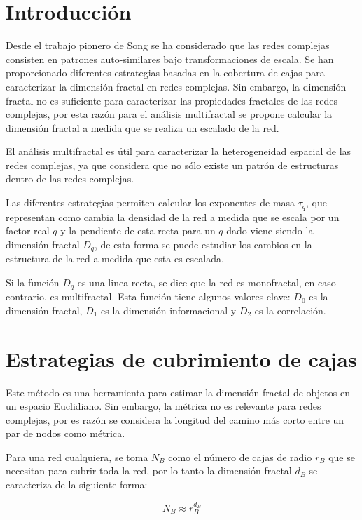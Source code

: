 \section{Introducción}

Desde el trabajo pionero de Song\cite{Song2005} se ha considerado que las redes complejas consisten en patrones auto-similares bajo transformaciones de escala. Se han proporcionado diferentes estrategias basadas en la cobertura de cajas para caracterizar la dimensión fractal en redes complejas. Sin embargo, la dimensión fractal no es suficiente para caracterizar las propiedades fractales de las redes complejas, por esta razón para el análisis multifractal se propone calcular la dimensión fractal a medida que se realiza un escalado de la red.

El análisis multifractal es útil para caracterizar la heterogeneidad espacial de las redes complejas, ya que considera que no sólo existe un patrón de estructuras dentro de las redes complejas.

Las diferentes estrategias permiten calcular los exponentes de masa $\tau_q$, que representan como cambia la densidad de la red a medida que se escala por un factor real $q$ y la pendiente de esta recta para un $q$ dado viene siendo la dimensión fractal $D_q$, de esta forma se puede estudiar los cambios en la estructura de la red a medida que esta es escalada.

Si la función $D_q$ es una linea recta, se dice que la red es monofractal, en caso contrario, es multifractal. Esta función tiene algunos valores clave\cite{Halsey1986}: $D_0$ es la dimensión fractal, $D_1$ es la dimensión  informacional y $D_2$ es la correlación.

\section{Estrategias de cubrimiento de cajas}
\label{cap4:seccionBox}

Este método es una herramienta para estimar la dimensión fractal de objetos en un espacio Euclidiano. Sin embargo, la métrica no es relevante para redes complejas, por es razón se considera la longitud del camino más corto entre un par de nodos como métrica. 

Para una red cualquiera, se toma $N_B$ como el número de cajas de radio $r_B$ que se necesitan para cubrir toda la red, por lo tanto la dimensión fractal $d_B$ se caracteriza de la siguiente forma:

\begin{equation}
    N_B \approx r_B^{d_B}
\end{equation}

